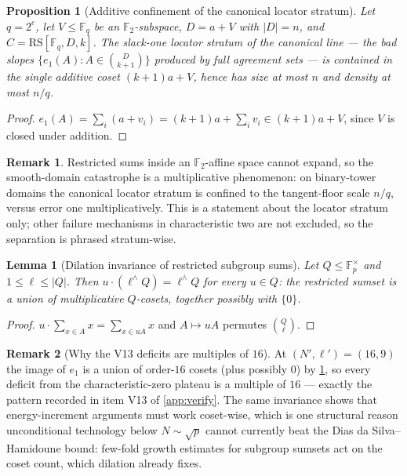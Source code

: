 \documentclass[11pt]{article}
\newtheorem{lemma}[lemma]{Lemma}
\newtheorem{proposition}[proposition]{Proposition}
\theoremstyle{definition}
\newtheorem{remark}[remark]{Remark}
\newcommand{\F}{\mathbb F}
\newcommand{\RS}{\mathrm{RS}}
\begin{document}
\begin{proposition}[Additive confinement of the canonical locator stratum]\label{prop:additive}
Let $q=2^e$, let $V\le\F_q$ be an $\F_2$-subspace, $D=a+V$ with $|D|=n$, and $C=\RS[\F_q,D,k]$.  The slack-one locator stratum of the canonical line --- the bad slopes $\{e_1(A):A\in\binom D{k+1}\}$ produced by full agreement sets --- is contained in the single additive coset $(k+1)a+V$, hence has size at most $n$ and density at most $n/q$.
\end{proposition}

\begin{proof}
$e_1(A)=\sum_{i}(a+v_i)=(k+1)a+\sum_iv_i\in(k+1)a+V$, since $V$ is closed under addition.
\end{proof}

\begin{remark}
Restricted sums inside an $\F_2$-affine space cannot expand, so the smooth-domain catastrophe is a multiplicative phenomenon: on binary-tower domains the canonical locator stratum is confined to the tangent-floor scale $n/q$, versus error one multiplicatively.  This is a statement about the locator stratum only; other failure mechanisms in characteristic two are not excluded, so the separation is phrased stratum-wise.
\end{remark}

\begin{lemma}[Dilation invariance of restricted subgroup sums]\label{lem:dilation}
Let $Q\le\F_p^\times$ and $1\le\ell\le|Q|$.  Then $u\cdot(\ell^{\wedge}Q)=\ell^{\wedge}Q$ for every $u\in Q$: the restricted sumset is a union of multiplicative $Q$-cosets, together possibly with $\{0\}$.
\end{lemma}

\begin{proof}
$u\cdot\sum_{x\in A}x=\sum_{x\in uA}x$ and $A\mapsto uA$ permutes $\binom Q\ell$.
\end{proof}

\begin{remark}[Why the V13 deficits are multiples of $16$]\label{rem:dilationv13}
At $(N',\ell')=(16,9)$ the image of $e_1$ is a union of order-$16$ cosets (plus possibly $0$) by \cref{lem:dilation}, so every deficit from the characteristic-zero plateau is a multiple of $16$ --- exactly the pattern recorded in item V13 of \cref{app:verify}.  The same invariance shows that energy-increment arguments must work coset-wise, which is one structural reason unconditional technology below $N\sim\sqrt p$ cannot currently beat the Dias da Silva--Hamidoune bound: few-fold growth estimates for subgroup sumsets \cite{Shk14} act on the coset count, which dilation already fixes.
\end{remark}
\end{document}
